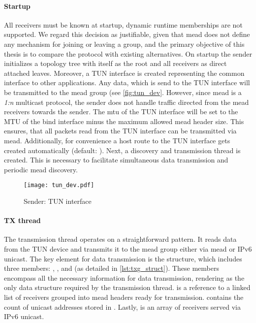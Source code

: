 \paragraph{Startup} %
\label{par:Startup}
All receivers must be known at startup, dynamic runtime memberships are not
    supported.
We regard this decision as justifiable, given that \gls{mead} does not define any
    mechanism for joining or leaving a group, and the primary objective of this
    thesis is to compare the protocol with existing alternatives.
On startup the sender initializes a topology tree with itself as the root and
    all receivers as direct attached leaves.
Moreover, a TUN interface is created representing the common interface to other
    applications.
Any data, which is send to the TUN interface will be transmitted to the
    \gls{mead} group (see \autoref{fig:tun_dev}.
However, since \gls{mead} is a \textit{1:n} multicast protocol, the sender does not
    handle traffic directed from the \gls{mead} receivers towards the sender.
The \gls{mtu} of the TUN interface will be set to the MTU of the bind interface
    minus the maximum allowed \gls{mead} header size.
This ensures, that all packets read from the TUN interface can be transmitted
    via \gls{mead}.
Additionally, for convenience a host route to the TUN interface gets created 
    automatically (default: ).
Next, a discovery and transmission thread is created.
This is necessary to facilitate simultaneous data transmission and periodic
    \gls{mead} discovery.

\begin{figure}
    \begin{center}
        \texttt{[image: tun\_dev.pdf]}
    \end{center}
    \caption{Sender: TUN interface}
    \label{fig:tun_dev}
\end{figure}

\paragraph{TX thread} %
\label{par:TX thread}
The transmission thread operates on a straightforward pattern.
It reads data from the TUN device and transmits it to the \gls{mead} group either
    via \gls{mead} or IPv6 unicast.
The key element for data transmission is the  structure,
    which includes three members: , , and
     (as detailed in \autoref{lst:txg_struct}).
These members encompass all the necessary information for data transmission,
    rendering  as the only data structure required by the
    transmission thread.
 is a reference to a linked list of receivers grouped into
    \gls{mead} headers ready for transmission.
 contains the count of unicast addresses stored in
    .
Lastly,  is an array of receivers served via IPv6 unicast.

